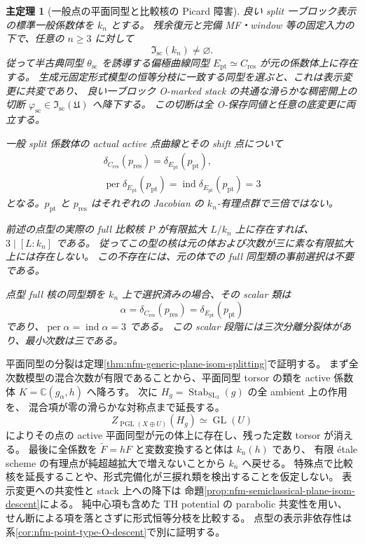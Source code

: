 \documentclass[11pt,a4paper]{ltjsarticle}
\numberwithin{equation}{section}
\newtheorem{maintheorem}{主定理}
\newcommand{\C}{\mathbb C}
\begin{document}
\begin{maintheorem}[一般点の平面同型と比較核の Picard 障害]
良い split 一ブロック表示の標準一般係数体を $k_n$ とする。
残余復元と完備 MF・window 等の固定入力の下で、任意の $n\ge3$ に対して
\[
 \mathfrak I_{\mathrm{sc}}(k_n)\ne\varnothing.
\]
従って半古典同型 $\theta_{\mathrm{sc}}$ を誘導する偏極曲線同型
$E_{\mathrm{pt}}\simeq C_{\mathrm{res}}$ が元の係数体上に存在する。
生成元固定形式模型の恒等分枝に一致する同型を選ぶと、これは表示変更に共変であり、
良い一ブロック O-marked stack の共通な滑らかな稠密開上の切断
$\varphi_{\mathrm{sc}}\in\mathfrak I_{\mathrm{sc}}(\mathfrak U)$ へ降下する。
この切断は全 O-保存同値と任意の底変更に両立する。

一般 split 係数体の actual active 点曲線とその shift 点について
\[
 \begin{gathered}
 \delta_{C_{\mathrm{res}}}(p_{\mathrm{res}})
   =\delta_{E_{\mathrm{pt}}}(p_{\mathrm{pt}}),\\
 \operatorname{per}\delta_{E_{\mathrm{pt}}}(p_{\mathrm{pt}})
   =\operatorname{ind}\delta_{E_{\mathrm{pt}}}(p_{\mathrm{pt}})=3
 \end{gathered}
\]
となる。$p_{\mathrm{pt}}$ と $p_{\mathrm{res}}$ はそれぞれの Jacobian の
$k_n$-有理点群で三倍ではない。

前述の点型の実際の full 比較核 $P$ が有限拡大 $L/k_n$ 上に存在すれば、
$3\mid[L:k_n]$ である。
従ってこの型の核は元の体および次数が三に素な有限拡大上には存在しない。
この不存在には、元の体での full 同型類の事前選択は不要である。

点型 full 核の同型類を $k_n$ 上で選択済みの場合、その scalar 類は
\[
 \alpha=\delta_{C_{\mathrm{res}}}(p_{\mathrm{res}})
       =\delta_{E_{\mathrm{pt}}}(p_{\mathrm{pt}})
\]
であり、$\operatorname{per}\alpha=\operatorname{ind}\alpha=3$ である。
この scalar 段階には三次分離分裂体があり、最小次数は三である。
\end{maintheorem}

平面同型の分裂は定理\ref{thm:nfm-generic-plane-isom-splitting}で証明する。
まず全次数模型の混合次数が有限であることから、平面同型 torsor の類を
active 係数体 $K=\C(g_\alpha,h)$ へ降ろす。
次に $H_g=\operatorname{Stab}_{\operatorname{SL}_3}(g)$ の全 ambient 上の作用を、
混合項が零の滑らかな対称点まで延長する。
\[
 Z_{\operatorname{PGL}(X\oplus U)}(H_g)\simeq\operatorname{GL}(U)
\]
によりその点の active 平面同型が元の体上に存在し、残った定数 torsor が消える。
最後に全係数を $\widetilde F=hF$ と変数変換すると体は $k_n(h)$ であり、
有限 \'etale scheme の有理点が純超越拡大で増えないことから $k_n$ へ戻せる。
特殊点で比較核を延長することや、形式完備化が三捩れ類を検出することを仮定しない。
表示変更への共変性と stack 上への降下は
命題\ref{prop:nfm-semiclassical-plane-isom-descent}による。
純中心項も含めた TH potential の parabolic 共変性を用い、
せん断による項を落とさずに形式恒等分枝を比較する。
点型の表示非依存性は系\ref{cor:nfm-point-type-O-descent}で別に証明する。
\end{document}

